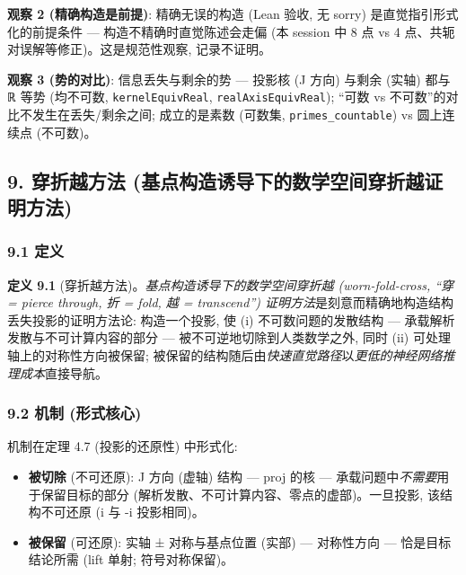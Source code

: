 \documentclass[
]{article}
\providecommand{\tightlist}{%
  \setlength{\itemsep}{0pt}\setlength{\parskip}{0pt}}
\begin{document}
\textbf{观察 2 (精确构造是前提)}: 精确无误的构造 (Lean 验收, 无 sorry)
是直觉指引形式化的前提条件 --- 构造不精确时直觉陈述会走偏 (本 session 中
8 点 vs 4 点、共轭对误解等修正)。这是规范性观察, 记录不证明。

\textbf{观察 3 (势的对比)}: 信息丢失与剩余的势 --- 投影核 (J 方向)
与剩余 (实轴) 都与 ℝ 等势 (均不可数, \texttt{kernelEquivReal},
\texttt{realAxisEquivReal}); ``可数 vs
不可数''的对比不发生在丢失/剩余之间; 成立的是素数 (可数集,
\texttt{primes\_countable}) vs 圆上连续点 (不可数)。

\subsection{9. 穿折越方法
(基点构造诱导下的数学空间穿折越证明方法)}\label{ux7a7fux6298ux8d8aux65b9ux6cd5-ux57faux70b9ux6784ux9020ux8bf1ux5bfcux4e0bux7684ux6570ux5b66ux7a7aux95f4ux7a7fux6298ux8d8aux8bc1ux660eux65b9ux6cd5}

\subsubsection{9.1 定义}\label{ux5b9aux4e49}

\textbf{定义 9.1} (穿折越方法)。\emph{基点构造诱导下的数学空间穿折越
(worn-fold-cross, ``穿 = pierce through, 折 = fold, 越 = transcend'')
证明方法}是刻意而精确地构造结构丢失投影的证明方法论: 构造一个投影, 使
(i) 不可数问题的发散结构 --- 承载解析发散与不可计算内容的部分 ---
被不可逆地切除到人类数学之外, 同时 (ii) 可处理轴上的对称性方向被保留;
被保留的结构随后由\emph{快速直觉路径}以\emph{更低的神经网络推理成本}直接导航。

\subsubsection{9.2 机制
(形式核心)}\label{ux673aux5236-ux5f62ux5f0fux6838ux5fc3}

机制在定理 4.7 (投影的还原性) 中形式化:

\begin{itemize}
\tightlist
\item
  \textbf{被切除} (不可还原): J 方向 (虚轴) 结构 --- proj 的核 ---
  承载问题中\emph{不需要}用于保留目标的部分
  (解析发散、不可计算内容、零点的虚部)。一旦投影, 该结构不可还原 (i 与
  -i 投影相同)。
\item
  \textbf{被保留} (可还原): 实轴 ± 对称与基点位置 (实部) --- 对称性方向
  --- 恰是目标结论所需 (lift 单射; 符号对称保留)。
\end{itemize}
\end{document}
